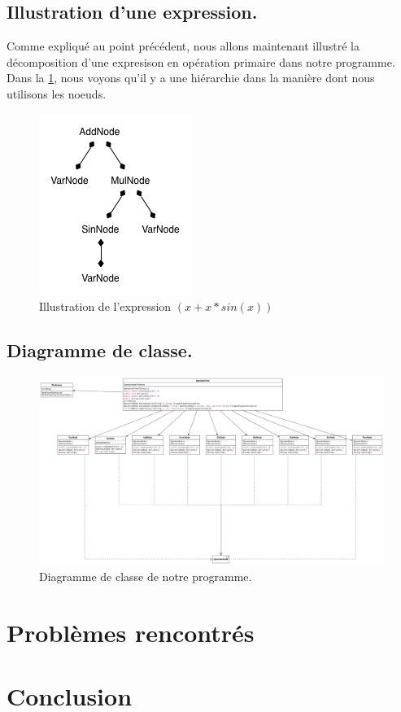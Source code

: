 \documentclass[10pt,a4paper]{article}
\begin{document}
\subsection*{Illustration d'une expression.}
Comme expliqué au point précédent, nous allons maintenant illustré la décomposition d'une expresison en opération primaire dans notre programme. Dans la \ref{fig:ExpressionTree}, nous voyons qu'il y a une hiérarchie dans la manière dont nous utilisons les noeuds. 
\begin{figure}[!h]
    \begin{center}
    \includegraphics[scale=0.5]{ExpressionTree.png}
    \caption{Illustration de l'expression $(x+x*sin(x))$}
    \label{fig:ExpressionTree}
    \end{center}
\end{figure}
\newpage
\subsection*{Diagramme de classe.}
\begin{figure}[!h]
    \begin{center}
    \includegraphics[scale=0.3,angle = 90]{M2_DerivationTree.png}
    \caption{Diagramme de classe de notre programme.}
    \label{fig:ClassDiagram}
    \end{center}
\end{figure}
\section*{Problèmes rencontrés}
\section*{Conclusion}
\end{document}
